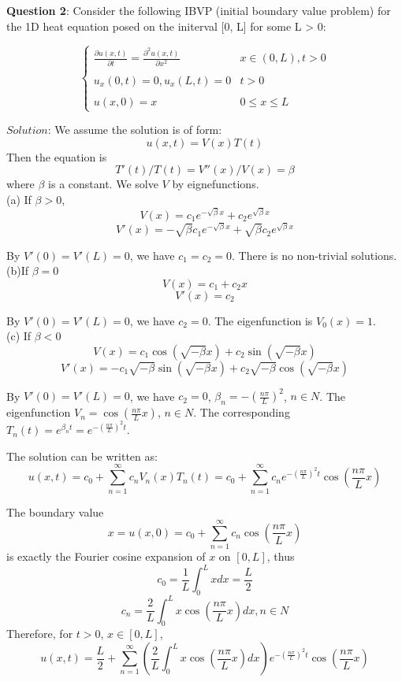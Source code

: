 \documentclass{article} %
\newcommand{\question}[2][]{\begin{flushleft}
        \textbf{Question #1}: {#2}

\end{flushleft}}
\begin{document}
    
    \question[2]{Consider the following IBVP (initial boundary value problem) for the 1D heat equation posed on the initerval [0, L] for some L > 0:}
\begin{equation}
\left \{ \begin{array}{llc}
\frac{\partial u(x, t)}{\partial t} =\frac{\partial^{2}u (x,t)}{\partial x^{2}} & x \in (0,L),  t>0 \\
\\
u_{x}(0,t) = 0, u_{x}(L, t) = 0& t>0 \\
\\
u(x, 0) = x & 0 \leq x \leq L
\end{array}\right.
\end{equation}\par
$Solution$: We assume the solution is of form:
$$
u(x, t) = V(x)T(t)
$$
Then the equation is 
$$
T'(t)/T(t) = V''(x)/V(x) = \beta
$$
where $\beta$ is a constant. We solve $V$ by eignefunctions.\\
(a) If $\beta > 0$, 
$$
V(x) = c_{1}e^{-\sqrt{\beta}x}+c_{2}e^{\sqrt{\beta}x}
$$
$$
V'(x) = -\sqrt{\beta}c_{1}e^{-\sqrt{\beta}x}+\sqrt{\beta}c_{2}e^{\sqrt{\beta}x}
$$\par
By $V'(0) = V'(L) =0$, we have $c_{1} = c_{2} =0$. There is no non-trivial solutions.\\
(b)If $\beta =0$
$$
V(x) =c_{1} +c_{2}x 
$$
$$
V'(x) =c_{2}
$$
\par
By $V'(0) = V'(L) =0$, we have $c_{2} = 0$. The eigenfunction is $V_{0}(x) = 1$.\\
(c)
If $\beta <0$
$$
V(x) = c_{1}\cos(\sqrt{-\beta}x)+c_{2}\sin(\sqrt{-\beta}x)
$$    
$$
V'(x)=-c_{1}\sqrt{-\beta}\sin(\sqrt{-\beta}x)+c_{2}\sqrt{-\beta}\cos(\sqrt{-\beta}x)
$$\par
By $V'(0) = V'(L) =0$, we have $c_{2} = 0$, $\beta_{n} = -\left(\frac{n\pi}{L}\right)^{2}$, $n \in N$. The eigenfunction $V_{n} = \cos(\frac{n\pi}{L}x)$, $n \in N$. The corresponding $T_{n}(t) = e^{\beta_{n}t}= e^{ -\left(\frac{n\pi}{L}\right)^{2}t}$.\par
The solution can be written as:
$$
u(x, t) = c_{0} + \sum_{n=1}^{\infty}c_{n}V_{n}(x)T_{n}(t)=c_{0} + \sum_{n=1}^{\infty}c_{n}e^{ -\left(\frac{n\pi}{L}\right)^{2}t}\cos(\frac{n\pi}{L}x)
$$\par
The boundary value
$$
x =u(x, 0) = c_{0} + \sum_{n=1}^{\infty}c_{n}\cos(\frac{n\pi}{L}x)
$$
is exactly the Fourier cosine expansion of $x$ on $[0, L]$, thus
$$
c_{0}= \frac{1}{L}\int_{0}^{L}xdx=\frac{L}{2}
$$
$$
c_{n} = \frac{2}{L}\int_{0}^{L}x\cos(\frac{n\pi}{L}x)dx, n\in N
$$
Therefore, for $t>0$, $x \in [0, L]$,
$$
u(x, t) = \frac{L}{2}+\sum_{n=1}^{\infty}\left(\frac{2}{L}\int_{0}^{L}x\cos(\frac{n\pi}{L}x)dx \right)e^{ -\left(\frac{n\pi}{L}\right)^{2}t}\cos(\frac{n\pi}{L}x)
$$
\end{document}
